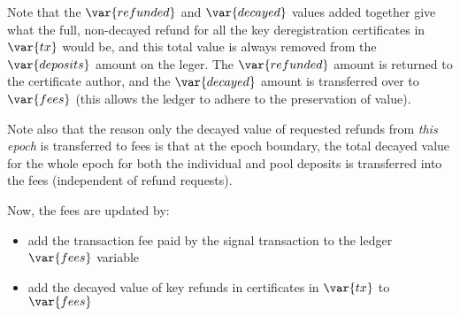 \documentclass[11pt,a4paper,dvipsnames]{article}
\theoremstyle{definition}
\theoremstyle{definition}
\begin{document}
Note that the $\var{refunded}$ and $\var{decayed}$ values added together give what the
full, non-decayed refund for all the key deregistration certificates in $\var{tx}$
would be, and this total value is always removed from the $\var{deposits}$
amount on the leger. The $\var{refunded}$ amount is returned to the certificate
author, and the $\var{decayed}$ amount is transferred over to $\var{fees}$
(this allows the ledger to adhere to the preservation of value).

Note also that the reason only the decayed value of requested refunds
from \textit{this epoch} is transferred to fees is that at the epoch
boundary, the total decayed value for the whole epoch for both the individual
and pool deposits is transferred into the fees (independent of refund
requests).

Now, the fees are updated by:

\begin{itemize}
\item add the transaction fee paid by the signal transaction to the ledger $\var{fees}$
variable
\item add the decayed value of key refunds in certificates in $\var{tx}$ to $\var{fees}$
\end{itemize}
\end{document}
